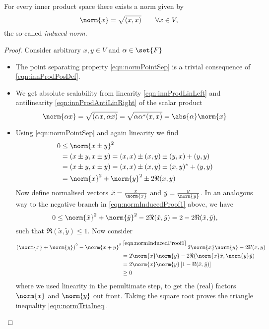 \begin{prop}
	For every inner product space there exists a norm given by 
	\begin{equation}
		\norm{x} = \sqrt{ (x,x) } \qquad \forall x \in V,
		\label{eqn:normInduced}
	\end{equation}
	the so-called \emph{induced norm}.
\end{prop}
\begin{proof}
	Consider arbitrary $x,y \in V$ and $\alpha \in \set{F}$
	\begin{itemize}
		\item The point separating property \eqref{eqn:normPointSep} is a trivial consequence of \eqref{eqn:innProdPosDef}.
		\item We get absolute scalability from linearity \eqref{eqn:innProdLinLeft} and antilinearity \eqref{eqn:innProdAntiLinRight} of the scalar product
			\[ \norm{\alpha x} = \sqrt{ (\alpha x,\alpha x) } = \sqrt{ \alpha \alpha^\ast (x,x) } = \abs{\alpha} \norm{x} \]
		\item Using \eqref{eqn:normPointSep} and again linearity we find
			\begin{align}
				\nonumber
				0 &\le \norm{x \pm y}^2 \\
				\nonumber
				  &= (x \pm y, x \pm y) = (x,x) \pm (x,y) \pm (y,x) + (y,y) \\
				\nonumber
				  &= (x \pm y, x \pm y) = (x,x) \pm (x,y) \pm (x,y)^\ast + (y,y) \\
				  &= \norm{x}^2 + \norm{y}^2 \pm 2\Re (x,y)
				\label{eqn:normInducedProof1}
			\end{align}
			Now define normalised vectors $\tilde{x} = \frac{x}{\norm{x}}$ and $\tilde{y} = \frac{y}{\norm{y}}$.
			In an analogous way to the negative branch in \eqref{eqn:normInducedProof1} above, we have
			\[ 0 \le \norm{\tilde{x}}^2 + \norm{\tilde{y}}^2 - 2\Re (\tilde{x},\tilde{y}) = 2 - 2 \Re (\tilde{x},\tilde{y}) ,\]
			such that $\Re  (\tilde{x},\tilde{y}) \le 1$.
			Now consider
			\begin{align}
				\nonumber
				\left(\norm{x} + \norm{y}\right)^2 - \norm{x + y}^2 &\stackrel{\eqref{eqn:normInducedProof1}}{=} 2 \norm{x} \norm{y} - 2 \Re (x,y) \\
				\nonumber
				&= 2 \norm{x} \norm{y} - 2 \Re ( \norm{x} \tilde{x}, \norm{y} \tilde{y} )  \\
				\nonumber
				&= 2 \norm{x} \norm{y} \left[ 1 - \Re (\tilde{x},\tilde{y}) \right] \\
				&\ge 0
				\label{eqn:normInducedProof2}
			\end{align}
			where we used linearity in the penultimate step, to get the (real) factors $\norm{x}$ and $\norm{y}$ out front. 
			Taking the square root proves the triangle inequality \eqref{eqn:normTriaIneq}.
	\end{itemize}
\end{proof}

